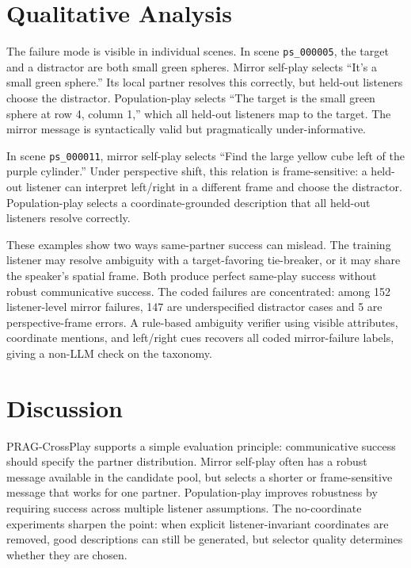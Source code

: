 \documentclass{article}
\begin{document}
\section{Qualitative Analysis}

The failure mode is visible in individual scenes. In scene \texttt{ps\_000005}, the target and a distractor are both small green spheres. Mirror self-play selects ``It's a small green sphere.'' Its local partner resolves this correctly, but held-out listeners choose the distractor. Population-play selects ``The target is the small green sphere at row 4, column 1,'' which all held-out listeners map to the target. The mirror message is syntactically valid but pragmatically under-informative.

In scene \texttt{ps\_000011}, mirror self-play selects ``Find the large yellow cube left of the purple cylinder.'' Under perspective shift, this relation is frame-sensitive: a held-out listener can interpret left/right in a different frame and choose the distractor. Population-play selects a coordinate-grounded description that all held-out listeners resolve correctly.

These examples show two ways same-partner success can mislead. The training listener may resolve ambiguity with a target-favoring tie-breaker, or it may share the speaker's spatial frame. Both produce perfect same-play success without robust communicative success. The coded failures are concentrated: among 152 listener-level mirror failures, 147 are underspecified distractor cases and 5 are perspective-frame errors. A rule-based ambiguity verifier using visible attributes, coordinate mentions, and left/right cues recovers all coded mirror-failure labels, giving a non-LLM check on the taxonomy.

\section{Discussion}

PRAG-CrossPlay supports a simple evaluation principle: communicative success should specify the partner distribution. Mirror self-play often has a robust message available in the candidate pool, but selects a shorter or frame-sensitive message that works for one partner. Population-play improves robustness by requiring success across multiple listener assumptions. The no-coordinate experiments sharpen the point: when explicit listener-invariant coordinates are removed, good descriptions can still be generated, but selector quality determines whether they are chosen.
\end{document}
